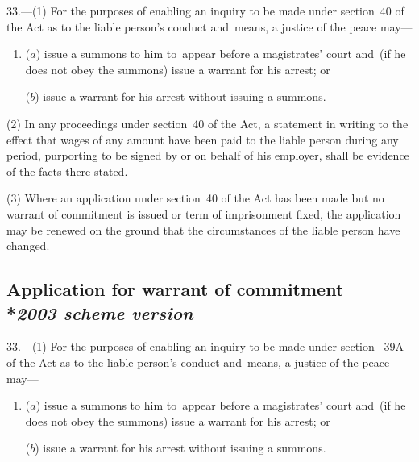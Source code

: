 \documentclass[12pt,a4paper]{article}
\begin{document}
33.—(1) For the purposes of enabling an inquiry to be made under section~40 of the Act as to the liable person’s conduct and~means, a justice of the peace 
may—
\begin{enumerate}\item[]
($a$) issue a summons to him to~appear before a magistrates' court and~(if he does not obey the summons) issue a warrant for his arrest; or

($b$) issue a warrant for his arrest without issuing a summons.
\end{enumerate}

(2) In any proceedings under section~40 of the Act, a statement in writing to the effect that wages of any amount have been paid to the liable person during any period, purporting to be signed by or on behalf of his employer, shall be evidence of the facts there stated.

(3) Where an application under section~40 of the Act has been made but no warrant of commitment is issued or term of imprisonment fixed, the application may be renewed on the ground that the circumstances of the liable person have changed.


\subsection[33. Application for warrant of commitment --- \emph{2003 scheme version}]{Application for warrant of commitment\\*\emph{2003 scheme version}}

33.—(1) For the purposes of enabling an inquiry to be made under section~%
39A  %
of the Act as to the liable person’s conduct and~means, a justice of the peace 
may—
\begin{enumerate}\item[]
($a$) issue a summons to him to~appear before a magistrates' court and~(if he does not obey the summons) issue a warrant for his arrest; or

($b$) issue a warrant for his arrest without issuing a summons.
\end{enumerate}
\end{document}
